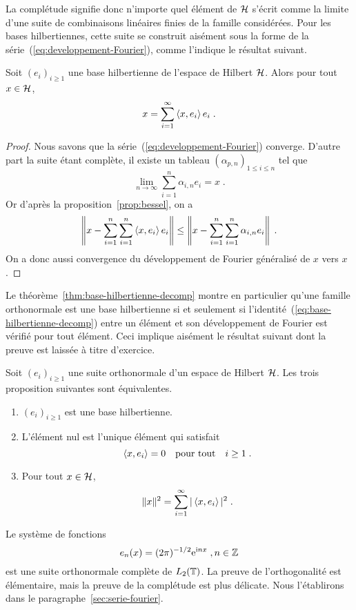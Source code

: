 La compl\'{e}tude signifie donc n'importe quel \'{e}l\'{e}ment de $\mathcal{H}$ s'\'{e}crit comme la
limite d'une suite de combinaisons lin\'{e}aires finies de la famille
consid\'{e}r\'{e}es. Pour les bases hilbertiennes, cette suite se construit ais\'{e}ment
sous la forme de la s\'{e}rie~(\ref{eq:developpement-Fourier}), comme l'indique le
r\'{e}sultat suivant.
\begin{theorem}
  \label{thm:base-hilbertienne-decomp}
Soit  $(e_i)_{i\geq1}$ une base hilbertienne de l'espace  de Hilbert
$\mathcal{H}$. Alors pour tout $x\in\mathcal{H}$,
\begin{equation}\label{eq:base-hilbertienne-decomp}
  x=\sum_{i=1}^\infty \left\langle x, e_i \right\rangle e_i\;.
\end{equation}
\end{theorem}
\begin{proof}
  Nous savons que la s\'{e}rie~(\ref{eq:developpement-Fourier}) converge.
  D'autre part la suite \'{e}tant compl\`{e}te, il existe un tableau
  $(\alpha_{p,n})_{1\leq i\leq n}$ tel que
$$
\lim_{n\to\infty} \sum_{i=1}^n \alpha_{i,n} e_i = x\;.
$$
Or d'apr\`{e}s la proposition~\ref{prop:bessel}, on a
$$
\left\|x-\sum_{i=1}^n \sum_{i=1}^n \left\langle x, e_i \right\rangle e_i\right\|
\leq \left\|x-\sum_{i=1}^n \sum_{i=1}^n \alpha_{i,n} e_i\right\|\;.
$$
On a donc aussi convergence du d\'{e}veloppement de Fourier g\'{e}n\'{e}ralis\'{e} de $x$ vers
$x$.

\end{proof}
Le th\'{e}or\`{e}me~\ref{thm:base-hilbertienne-decomp} montre en particulier
qu'une famille orthonormale est une base hilbertienne si et seulement si
l'identit\'{e}~(\ref{eq:base-hilbertienne-decomp}) entre un \'{e}l\'{e}ment et son
d\'{e}veloppement de Fourier est v\'{e}rifi\'{e} pour tout \'{e}l\'{e}ment.
Ceci implique ais\'{e}ment
le r\'{e}sultat suivant dont la preuve est laiss\'{e}e \`{a} titre d'exercice.
\begin{theorem}
\label{theo:caracterisation-base-complete}
Soit $(e_i)_{i\geq1}$ une suite orthonormale  d'un espace de Hilbert $\mathcal{H}$.
Les trois proposition suivantes sont \'{e}quivalentes.
\begin{enumerate}[label=\emph{\alph*})]
\item $(e_i)_{i\geq1}$ est une base hilbertienne.
\item L'\'{e}l\'{e}ment nul est l'unique \'{e}l\'{e}ment qui satisfait
$$
\left\langle x, e_i \right\rangle=0\quad\text{pour tout}\quad i\geq1\;.
$$
\item Pour tout $x \in \mathcal{H}$,
\begin{equation}
\label{eq:parseval}
\|x\|^2 = \sum_{i=1}^\infty |\left\langle x, e_i \right\rangle|^2 \;.
\end{equation}
\end{enumerate}
\end{theorem}
\begin{example}
Le syst\`{e}me de fonctions
\[
e_n(x)= (2 \pi)^{-1/2} \mathrm{e}^{\mathrm{i} n x} \;, n \in \mathbb{Z}
\]
est une suite orthonormale compl\`{e}te de $L_2(\mathbb{T})$. La preuve de
l'orthogonalit\'{e} est \'{e}l\'{e}mentaire, mais la preuve de la compl\'{e}tude est plus
d\'{e}licate. Nous l'\'{e}tablirons dans le paragraphe~\ref{sec:serie-fourier}.
\end{example}


